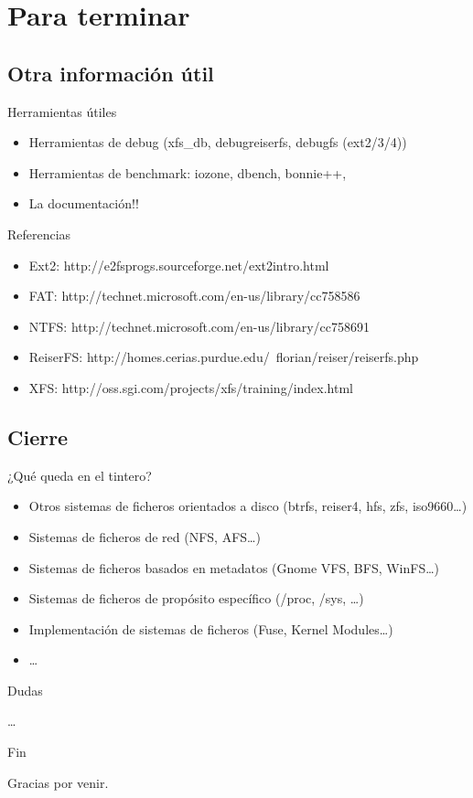 \section*{Para terminar}
\subsection*{Otra información útil}
\begin{frame}{Herramientas útiles}
  \begin{itemize}
    \item Herramientas de debug (xfs\_db, debugreiserfs, debugfs (ext2/3/4))
    \item Herramientas de benchmark: iozone, dbench, bonnie++,
    \item La documentación!!
  \end{itemize}
\end{frame}

\begin{frame}{Referencias}
  \begin{itemize}
    \item Ext2: http://e2fsprogs.sourceforge.net/ext2intro.html
    \item FAT: http://technet.microsoft.com/en-us/library/cc758586%
    \item NTFS: http://technet.microsoft.com/en-us/library/cc758691%
    \item ReiserFS: http://homes.cerias.purdue.edu/~florian/reiser/reiserfs.php
    \item XFS: http://oss.sgi.com/projects/xfs/training/index.html
  \end{itemize}
\end{frame}

\subsection*{Cierre}

\begin{frame}{¿Qué queda en el tintero?}
  \begin{itemize}
    \item Otros sistemas de ficheros orientados a disco (btrfs, reiser4, hfs, zfs, iso9660\dots)
    \item Sistemas de ficheros de red (NFS, AFS\dots)
    \item Sistemas de ficheros basados en metadatos (Gnome VFS, BFS, WinFS\dots)
    \item Sistemas de ficheros de propósito específico (/proc, /sys, \dots)
    \item Implementación de sistemas de ficheros (Fuse, Kernel Modules\dots)
    \item \dots
  \end{itemize}
\end{frame}

\begin{frame}{Dudas}
  \begin{center}
    \dots
  \end{center}
\end{frame}

\begin{frame}{Fin}
  \begin{center}
    Gracias por venir.
  \end{center}
\end{frame}
